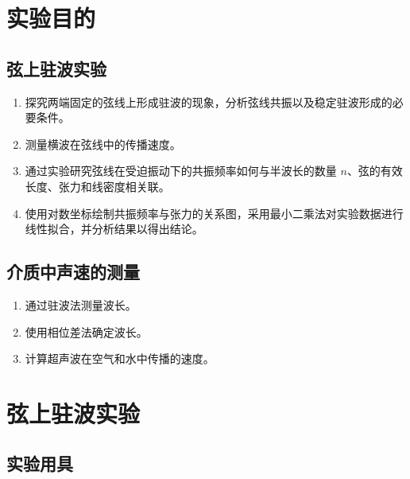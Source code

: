\documentclass[zihao=5, UTF8]{article}
\theoremstyle{MyLineTheoremStyle} %
\theoremstyle{MyBlockTheoremStyle} %
\theoremstyle{MySubsubsectionStyle} %
\begin{document}
\section{实验目的}

\subsection{弦上驻波实验}

\begin{enumerate}
    \item 探究两端固定的弦线上形成驻波的现象，分析弦线共振以及稳定驻波形成的必要条件。
    
    \item 测量横波在弦线中的传播速度。
    
    \item 通过实验研究弦线在受迫振动下的共振频率如何与半波长的数量 \(n\)、弦的有效长度、张力和线密度相关联。
    
    \item 使用对数坐标绘制共振频率与张力的关系图，采用最小二乘法对实验数据进行线性拟合，并分析结果以得出结论。
\end{enumerate}

\subsection{介质中声速的测量}

\begin{enumerate}
    \item 通过驻波法测量波长。
    
    \item 使用相位差法确定波长。
    
    \item 计算超声波在空气和水中传播的速度。
\end{enumerate}

\section{弦上驻波实验}\thispagestyle{fancy} 

\subsection{实验用具}
\end{document}
